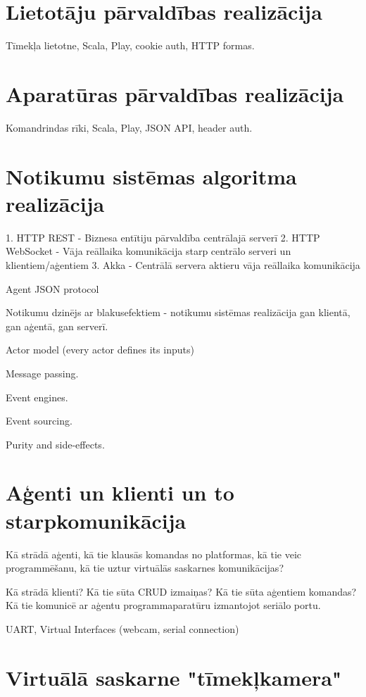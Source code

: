 \section{Lietotāju pārvaldības realizācija}
\label{sec:usermgmt}

Tīmekļa lietotne, Scala, Play, cookie auth, HTTP formas.

\section{Aparatūras pārvaldības realizācija}
\label{sec:hwmgmt}

Komandrindas rīki, Scala, Play, JSON API, header auth.

\section{Notikumu sistēmas algoritma realizācija}
\label{sec:dipactorsystem}

1. HTTP REST - Biznesa entītiju pārvaldība centrālajā serverī
2. HTTP WebSocket - Vāja reāllaika komunikācija starp centrālo serveri un klientiem/aģentiem
3. Akka - Centrālā servera aktieru vāja reāllaika komunikācija

Agent JSON protocol

Notikumu dzinējs ar blakusefektiem - notikumu sistēmas realizācija gan klientā, gan aģentā, gan serverī.

Actor model (every actor defines its inputs)

Message passing.

Event engines.

Event sourcing.

Purity and side-effects.

\section{Aģenti un klienti un to starpkomunikācija}
\label{sec:agentclient}

Kā strādā aģenti, kā tie klausās komandas no platformas, kā tie veic programmēšanu,
kā tie uztur virtuālās saskarnes komunikācijas?

Kā strādā klienti? Kā tie sūta CRUD izmaiņas? Kā tie sūta aģentiem komandas? Kā tie
komunicē ar aģentu programmaparatūru izmantojot seriālo portu.

UART, Virtual Interfaces (webcam, serial connection)

\section{Virtuālā saskarne "tīmekļkamera"}
\label{sec:vinweb}

